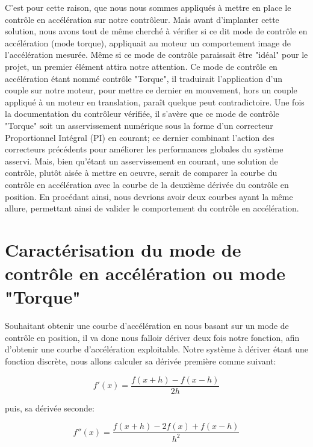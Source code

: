 \documentclass[french,a4paper,12pt]{report}
\begin{document}
	C'est pour cette raison, que nous nous sommes appliqués à mettre en place le contrôle en accélération sur notre contrôleur. Mais avant d'implanter cette solution, nous avons tout de même cherché à vérifier si ce dit mode de contrôle en accélération (mode torque), appliquait au moteur un comportement image de l'accélération mesurée. Même si ce mode de contrôle paraissait être "idéal" pour le projet, un premier élément attira notre attention. Ce mode de contrôle en accélération étant nommé contrôle "Torque", il traduirait l'application d'un couple sur notre moteur, pour mettre ce dernier en mouvement, hors un couple appliqué à un moteur en translation, paraît quelque peut contradictoire.
	Une fois la documentation du contrôleur vérifiée, il s'avère que ce mode de contrôle "Torque" soit un asservissement numérique sous la forme d'un correcteur Proportionnel Intégral (PI) en courant; ce dernier combinant l'action des correcteurs précédents pour améliorer les performances globales du système asservi. Mais, bien qu'étant un asservissement en courant, une solution de contrôle, plutôt aisée à mettre en oeuvre, serait de comparer la courbe du contrôle en accélération avec la courbe de la deuxième dérivée du contrôle en position. En procédant ainsi, nous devrions avoir deux courbes ayant la même allure, permettant ainsi de valider le comportement du contrôle en accélération.
	
	\newpage
	
		\section{Caractérisation du mode de contrôle en accélération ou mode "Torque"}

	Souhaitant obtenir une courbe d'accélération en nous basant sur un mode de contrôle en position, il va donc nous falloir dériver deux fois notre fonction, afin d'obtenir une courbe d'accélération exploitable.
	Notre système à dériver étant une fonction discrète, nous allons calculer sa dérivée première comme suivant: 
	
	\[	
		f'(x) = \frac{f(x+h) - f(x-h)}{2h}
	\]
	
	puis, sa dérivée seconde:
	
	\[	
		f''(x) = \frac{f(x+h) - 2f(x) + f(x-h)}{h^2}
	\]
	
\end{document}
